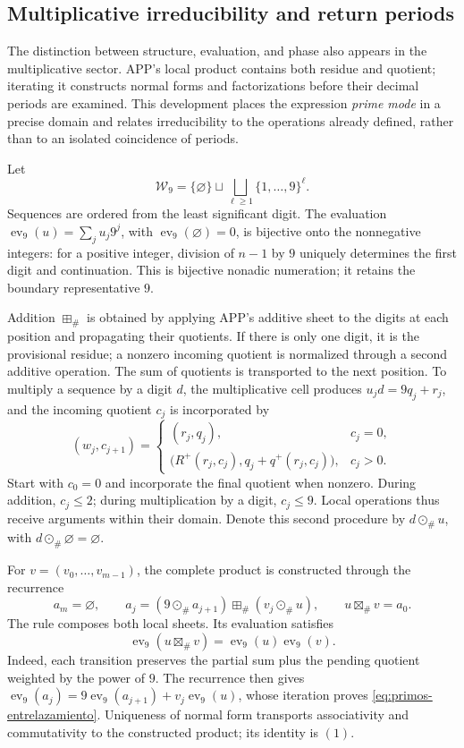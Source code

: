 \subsection{Multiplicative irreducibility and return periods}
\label{primos-retornos}

The distinction between structure, evaluation, and phase also appears in
the multiplicative sector. APP's local product contains both residue and
quotient; iterating it constructs normal forms and factorizations before
their decimal periods are examined. This development places the expression
\emph{prime mode} in a precise domain and relates irreducibility to the
operations already defined, rather than to an isolated coincidence
of periods.

Let
\[
 \mathcal W_9=\{\varnothing\}\sqcup
 \bigsqcup_{\ell\geq1}\{1,\ldots,9\}^{\ell}.
\]
Sequences are ordered from the least significant digit. The evaluation
\(\operatorname{ev}_9(u)=\sum_j u_j9^j\), with
\(\operatorname{ev}_9(\varnothing)=0\), is bijective onto the nonnegative
integers: for a positive integer, division of \(n-1\) by \(9\)
uniquely determines the first digit and continuation. This is bijective
nonadic numeration; it retains the boundary representative \(9\).

Addition \(\boxplus_\#\) is obtained by applying APP's additive sheet
to the digits at each position and propagating their quotients. If there
is only one digit, it is the provisional residue; a nonzero incoming
quotient is normalized through a second additive operation. The sum of
quotients is transported to the next position. To multiply a sequence by
a digit \(d\), the multiplicative cell produces
\(u_jd=9q_j+r_j\), and the incoming quotient \(c_j\) is incorporated by
\[
 (w_j,c_{j+1})=
 \begin{cases}
 (r_j,q_j),&c_j=0,\\
 \bigl(R^+(r_j,c_j),q_j+q^+(r_j,c_j)\bigr),&c_j>0.
 \end{cases}
\]
Start with \(c_0=0\) and incorporate the final quotient when nonzero.
During addition, \(c_j\leq2\); during multiplication by a digit,
\(c_j\leq9\). Local operations thus receive arguments within
their domain. Denote this second procedure by \(d\odot_\#u\),
with \(d\odot_\#\varnothing=\varnothing\).

For \(v=(v_0,\ldots,v_{m-1})\), the complete product is constructed
through the recurrence
\[
 a_m=\varnothing,\qquad
 a_j=(9\odot_\#a_{j+1})\boxplus_\#(v_j\odot_\#u),
 \qquad u\boxtimes_\#v=a_0.
\]
The rule composes both local sheets. Its evaluation satisfies
\begin{equation}
 \operatorname{ev}_9(u\boxtimes_\#v)
   =\operatorname{ev}_9(u)\operatorname{ev}_9(v).
 \label{eq:primos-entrelazamiento}
\end{equation}
Indeed, each transition preserves the partial sum plus the pending
quotient weighted by the power of \(9\). The recurrence then gives
\(\operatorname{ev}_9(a_j)=9\operatorname{ev}_9(a_{j+1})+
v_j\operatorname{ev}_9(u)\), whose iteration proves
\eqref{eq:primos-entrelazamiento}. Uniqueness of normal form transports
associativity and commutativity to the constructed product; its identity is \((1)\).

